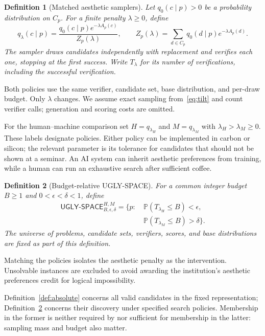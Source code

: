 \documentclass[11pt]{article}
\newtheorem{definition}{Definition}[section]
\theoremstyle{remark}
\newcommand{\Prb}{\mathbb{P}}
\newcommand{\ugly}{\mathsf{UGLY\text{-}SPACE}}
\begin{document}
\begin{definition}[Matched aesthetic samplers]
Let $q_0(c\mid p)>0$ be a probability distribution on $C_p$. For a finite
penalty $\lambda\geq0$, define
\begin{equation}\label{eq:tilt}
 q_\lambda(c\mid p)=
 \frac{q_0(c\mid p)e^{-\lambda A_p(c)}}{Z_p(\lambda)},
 \qquad
 Z_p(\lambda)=\sum_{d\in C_p}q_0(d\mid p)e^{-\lambda A_p(d)}.
\end{equation}
The sampler draws candidates independently with replacement and verifies
each one, stopping at the first success. Write $T_\lambda$ for its number
of verifications, including the successful verification.
\end{definition}

Both policies use the same verifier, candidate set, base distribution,
and per-draw budget. Only $\lambda$ changes. We assume exact sampling
from~\eqref{eq:tilt} and count verifier calls; generation and scoring costs
are omitted.

For the human--machine comparison set $H=q_{\lambda_H}$ and
$M=q_{\lambda_M}$ with $\lambda_H>\lambda_M\geq0$. These labels designate
policies. Either policy can be implemented in carbon or silicon; the
relevant parameter is its tolerance for candidates that should not be
shown at a seminar. An AI system can inherit aesthetic preferences from
training, while a human can run an exhaustive search after sufficient coffee.

\begin{definition}[Budget-relative UGLY-SPACE]\label{def:ugly}
For a common integer budget $B\geq1$ and $0<\epsilon<\delta<1$, define
\begin{align*}
 \ugly^{H,M}_{B,\epsilon,\delta}
 =\{p:\ &\Prb(T_{\lambda_H}\leq B)<\epsilon,\\[-2pt]
         &\Prb(T_{\lambda_M}\leq B)>\delta\}.
\end{align*}
The universe of problems, candidate sets, verifiers, scores, and base
distributions are fixed as part of this definition.
\end{definition}

Matching the policies isolates the aesthetic penalty as the intervention.
Unsolvable instances are excluded to avoid awarding the institution's
aesthetic preferences credit for logical impossibility.

Definition~\ref{def:absolute} concerns all valid candidates in the fixed
representation; Definition~\ref{def:ugly} concerns their discovery under
specified search policies. Membership in the former is neither required
by nor sufficient for membership in the latter: sampling mass and budget
also matter.
\end{document}
